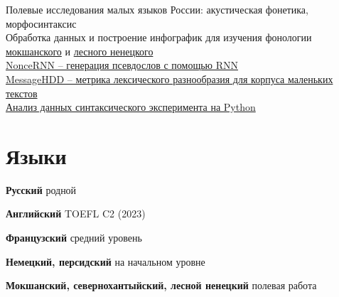 \documentclass[11pt]{article} %
\begin{document}
Полевые исследования малых языков России: акустическая фонетика, морфосинтаксис\\
Обработка данных и построение инфографик для изучения фонологии \href{https://github.com/thddbptnsndshs/tolerance_principle_moksha}{мокшанского} и \href{https://github.com/thddbptnsndshs/forest_nenets_vowels/tree/develop}{лесного ненецкого}\\
\href{https://github.com/thddbptnsndshs/nonce-words}{NonceRNN -- генерация псевдослов с помощью RNN}\\
\href{https://github.com/thddbptnsndshs/MessageHDD}{MessageHDD -- метрика лексического разнообразия для корпуса маленьких текстов}\\
\href{https://github.com/thddbptnsndshs/idioms}{Анализ данных синтаксического эксперимента на Python}

\section*{Языки}


\begin{minipage}[t]{0.95\linewidth}

    \begin{multicols}{2}
\begin{compactitem}[\ding{95}]
	\item \textbf{Русский} родной
	\item \textbf{Английский} TOEFL C2 (2023)
	\item \textbf{Французский} средний уровень
	\item \textbf{Немецкий, персидский} на начальном уровне
	\item \textbf{Мокшанский, севернохантыйский, лесной ненецкий} полевая работа
\end{compactitem}
	\end{multicols}

\end{minipage}
\end{document}
